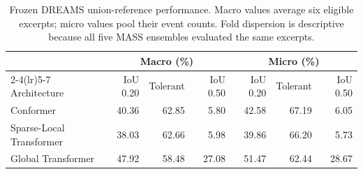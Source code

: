 \begin{table}[!t]
\centering
\caption{Frozen DREAMS union-reference performance. Macro values average six eligible excerpts; micro values pool their event counts. Fold dispersion is descriptive because all five MASS ensembles evaluated the same excerpts.}
\label{tab:dreams-external-results}
\footnotesize
\begin{tabular}{lrrrrrr}
\toprule
& \multicolumn{3}{c}{Macro (\%)} & \multicolumn{3}{c}{Micro (\%)} \\
\cmidrule(lr){2-4}\cmidrule(lr){5-7}
Architecture & IoU 0.20 & Tolerant & IoU 0.50 & IoU 0.20 & Tolerant & IoU 0.50 \\
\midrule
Conformer & 40.36 & 62.85 & 5.80 & 42.58 & 67.19 & 6.05 \\
Sparse-Local Transformer & 38.03 & 62.66 & 5.98 & 39.86 & 66.20 & 5.73 \\
Global Transformer & 47.92 & 58.48 & 27.08 & 51.47 & 62.44 & 28.67 \\
\bottomrule
\end{tabular}
\end{table}
